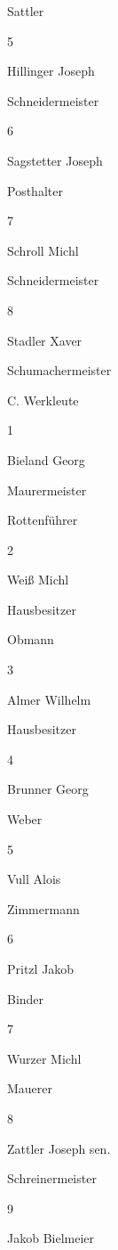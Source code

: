 Sattler



5

Hillinger Joseph

Schneidermeister



6

Sagstetter Joseph

Posthalter



7

Schroll Michl

Schneidermeister



8

Stadler Xaver

Schumachermeister





C. Werkleute

1

Bieland Georg

Maurermeister

Rottenführer

2

Weiß Michl

Hausbesitzer

Obmann

3

Almer Wilhelm

Hausbesitzer



4

Brunner Georg

Weber



5

Vull Alois

Zimmermann



6

Pritzl Jakob

Binder



7

Wurzer Michl

Mauerer



8

Zattler Joseph sen.

Schreinermeister



9

Jakob Bielmeier

